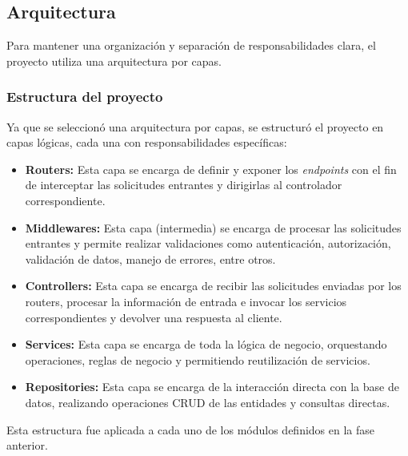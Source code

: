 \subsection{Arquitectura}
Para mantener una organización y separación de responsabilidades clara, el proyecto utiliza una arquitectura por capas.

\subsubsection{Estructura del proyecto}
Ya que se seleccionó una arquitectura por capas, se estructuró el proyecto en capas lógicas, cada una con responsabilidades
específicas:
\begin{itemize}
    \item \textbf{Routers:} Esta capa se encarga de definir y exponer los \textit{endpoints} con el fin de interceptar las
            solicitudes entrantes y dirigirlas al controlador correspondiente.
    \item \textbf{Middlewares:} Esta capa (intermedia) se encarga de procesar las solicitudes entrantes y permite realizar
            validaciones como autenticación, autorización, validación de datos, manejo de errores, entre otros.
    \item \textbf{Controllers:} Esta capa se encarga de recibir las solicitudes enviadas por los routers, procesar la información
            de entrada e invocar los servicios correspondientes y devolver una respuesta al cliente.
    \item \textbf{Services:} Esta capa se encarga de toda la lógica de negocio, orquestando operaciones, reglas de negocio y
        permitiendo reutilización de servicios.
    \item \textbf{Repositories:} Esta capa se encarga de la interacción directa con la base de datos, realizando operaciones CRUD
        de las entidades y consultas directas.
\end{itemize}

Esta estructura fue aplicada a cada uno de los módulos definidos en la fase anterior.

